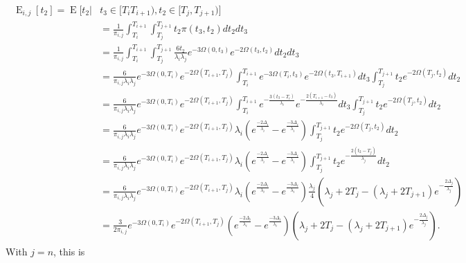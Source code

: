 \documentclass{article}
\DeclareMathOperator{\E}{E}
\begin{document}
\begin{align}
    \begin{split}
        \E_{i,j}[t_2] = \E\big[t_2|&t_3 \in [T_i T_{i+1}),t_2 \in [T_j,T_{j+1}) \big]\\
        &= \frac{1}{\pi_{i,j}}\int_{T_i}^{T_{i+1}}\int_{T_j}^{T_{j+1}}t_2\pi(t_3,t_2)dt_2dt_3\\
        &= \frac{1}{\pi_{i,j}}\int_{T_i}^{T_{i+1}}\int_{T_j}^{T_{j+1}}
            \frac{6t_2}{\lambda_i \lambda_j}e^{-3\Omega(0,t_3)}e^{-2\Omega(t_3,t_2)}dt_2dt_3\\
        &= \frac{6}{\pi_{i,j}\lambda_i\lambda_j}e^{-3\Omega(0,T_i)}e^{-2\Omega(T_{i+1},T_j)}
            \int_{T_i}^{T_{i+1}}e^{-3\Omega(T_i,t_3)}e^{-2\Omega(t_3,T_{i+1})}dt_3
            \int_{T_j}^{T_{j+1}}t_2e^{-2\Omega(T_j,t_2)}dt_2\\
        &= \frac{6}{\pi_{i,j}\lambda_i\lambda_j}e^{-3\Omega(0,T_i)}e^{-2\Omega(T_{i+1},T_j)}
            \int_{T_i}^{T_{i+1}}e^{-\frac{3(t_3-T_i)}{\lambda_i}}e^{-\frac{2(T_{i+1}-t_3)}{\lambda_i}}dt_3
            \int_{T_j}^{T_{j+1}}t_2e^{-2\Omega(T_j,t_2)}dt_2\\
        &= \frac{6}{\pi_{i,j}\lambda_i\lambda_j}e^{-3\Omega(0,T_i)}e^{-2\Omega(T_{i+1},T_j)}
            \lambda_i \left(e^{\frac{-2\Delta_i}{\lambda_i}}-e^{\frac{-3\Delta_i}{\lambda_i}}\right)
            \int_{T_j}^{T_{j+1}}t_2e^{-2\Omega(T_j,t_2)}dt_2\\
        &= \frac{6}{\pi_{i,j}\lambda_i\lambda_j}e^{-3\Omega(0,T_i)}e^{-2\Omega(T_{i+1},T_j)}
            \lambda_i \left(e^{\frac{-2\Delta_i}{\lambda_i}}-e^{\frac{-3\Delta_i}{\lambda_i}}\right)
            \int_{T_j}^{T_{j+1}}t_2e^{-\frac{2(t_2-T_j)}{\lambda_j}}dt_2\\
        &= \frac{6}{\pi_{i,j}\lambda_i\lambda_j}e^{-3\Omega(0,T_i)}e^{-2\Omega(T_{i+1},T_j)}
            \lambda_i \left(e^{\frac{-2\Delta_i}{\lambda_i}}-e^{\frac{-3\Delta_i}{\lambda_i}}\right)
            \frac{\lambda_j}{4}\left(\lambda_j+2T_j-(\lambda_j +2 T_{j+1}) e^{-\frac{2\Delta_j}{\lambda_j}}\right)\\
        &= \frac{3}{2\pi_{i,j}}e^{-3\Omega(0,T_i)}e^{-2\Omega(T_{i+1},T_j)}
            \left(e^{\frac{-2\Delta_i}{\lambda_i}}-e^{\frac{-3\Delta_i}{\lambda_i}}\right)
            \left(\lambda_j+2T_j-(\lambda_j +2 T_{j+1}) e^{-\frac{2\Delta_j}{\lambda_j}}\right).
    \end{split}
    \label{eq:Et2}
\end{align}
With $j=n$, this is 
\end{document}
